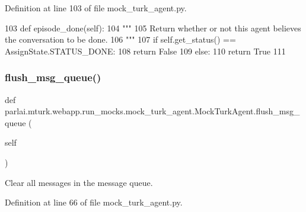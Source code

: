 Definition at line 103 of file mock\+\_\+turk\+\_\+agent.\+py.


\begin{DoxyCode}
103     \textcolor{keyword}{def }episode\_done(self):
104         \textcolor{stringliteral}{"""}
105 \textcolor{stringliteral}{        Return whether or not this agent believes the conversation to be done.}
106 \textcolor{stringliteral}{        """}
107         \textcolor{keywordflow}{if} self.get\_status() == AssignState.STATUS\_DONE:
108             \textcolor{keywordflow}{return} \textcolor{keyword}{False}
109         \textcolor{keywordflow}{else}:
110             \textcolor{keywordflow}{return} \textcolor{keyword}{True}
111 
\end{DoxyCode}
\mbox{\label{classparlai_1_1mturk_1_1webapp_1_1run__mocks_1_1mock__turk__agent_1_1MockTurkAgent_aff1194220b1656a156e3428d0ae7e09d}} 
\subsubsection{\texorpdfstring{flush\+\_\+msg\+\_\+queue()}{flush\_msg\_queue()}}
{\footnotesize\ttfamily def parlai.\+mturk.\+webapp.\+run\+\_\+mocks.\+mock\+\_\+turk\+\_\+agent.\+Mock\+Turk\+Agent.\+flush\+\_\+msg\+\_\+queue (\begin{DoxyParamCaption}\item[{}]{self }\end{DoxyParamCaption})}

\begin{DoxyVerb}Clear all messages in the message queue.
\end{DoxyVerb}
 

Definition at line 66 of file mock\+\_\+turk\+\_\+agent.\+py.


